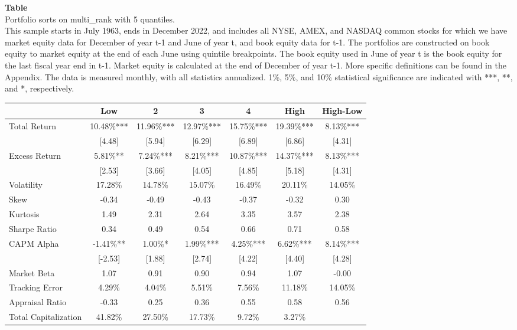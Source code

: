 \begin{table*}[ht!]
\raggedright
{}
\label{tab: quantile_sortmulti_rank_with_5_quantiles}
\textbf{Table \thetable} \\
Portfolio sorts on multi\_rank with 5 quantiles. \\
\hspace*{1em}This sample starts in July 1963, ends in December 2022, and includes all NYSE, AMEX, and NASDAQ common stocks for which we have market equity data for December of year t-1 and June of year t, and book equity data for t-1. The portfolios are constructed on book equity to market equity at the end of each June using quintile breakpoints.  The book equity used in June of year t is the book equity for the last fiscal year end in t-1.  Market equity is calculated at the end of December of year t-1.  More specific definitions can be found in the Appendix.  The data is measured monthly, with all statistics annualized.  1\%, 5\%, and 10\% statistical significance are indicated with ***, **, and *, respectively. \\
\vspace{0.5em}
\centering
\begin{adjustbox}{max width=\textwidth}
\begin{tabular}{@{}lcccccc@{}}
\toprule
 & Low & 2 & 3 & 4 & High & High-Low \\
\midrule
Total Return & 10.48\%*** & 11.96\%*** & 12.97\%*** & 15.75\%*** & 19.39\%*** & 8.13\%*** \\
 & [4.48] & [5.94] & [6.29] & [6.89] & [6.86] & [4.31] \\
Excess Return & 5.81\%** & 7.24\%*** & 8.21\%*** & 10.87\%*** & 14.37\%*** & 8.13\%*** \\
 & [2.53] & [3.66] & [4.05] & [4.85] & [5.18] & [4.31] \\
Volatility & 17.28\% & 14.78\% & 15.07\% & 16.49\% & 20.11\% & 14.05\% \\
Skew & -0.34 & -0.49 & -0.43 & -0.37 & -0.32 & 0.30 \\
Kurtosis & 1.49 & 2.31 & 2.64 & 3.35 & 3.57 & 2.38 \\
Sharpe Ratio & 0.34 & 0.49 & 0.54 & 0.66 & 0.71 & 0.58 \\
CAPM Alpha & -1.41\%** & 1.00\%* & 1.99\%*** & 4.25\%*** & 6.62\%*** & 8.14\%*** \\
 & [-2.53] & [1.88] & [2.74] & [4.22] & [4.40] & [4.28] \\
Market Beta & 1.07 & 0.91 & 0.90 & 0.94 & 1.07 & -0.00 \\
Tracking Error & 4.29\% & 4.04\% & 5.51\% & 7.56\% & 11.18\% & 14.05\% \\
Appraisal Ratio & -0.33 & 0.25 & 0.36 & 0.55 & 0.58 & 0.56 \\
Total Capitalization & 41.82\% & 27.50\% & 17.73\% & 9.72\% & 3.27\% &  \\
\bottomrule
\end{tabular}
\end{adjustbox}
\end{table*}